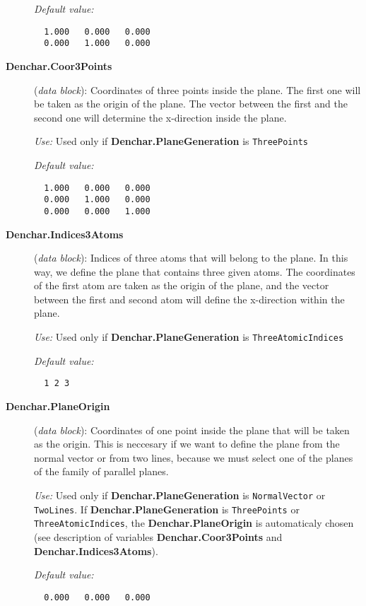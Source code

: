 \begin{description}
{\it Default value:} 
\begin{verbatim}
  1.000   0.000   0.000
  0.000   1.000   0.000
\end{verbatim}

\item[{\bf Denchar.Coor3Points}] ({\it data block}): 
Coordinates of three points inside the plane. The first one will be taken
as the origin of the plane. The vector between the first and the second one 
will determine the x-direction inside the plane.

{\it Use:} Used only if {\bf Denchar.PlaneGeneration} is {\tt ThreePoints}
    
{\it Default value:} 
\begin{verbatim}
  1.000   0.000   0.000
  0.000   1.000   0.000
  0.000   0.000   1.000
\end{verbatim}

\item[{\bf Denchar.Indices3Atoms}] ({\it data block}): 
Indices of three atoms that will belong to the plane. In this way, we
define the plane that contains three given atoms. The coordinates
of the first atom are taken as the origin of the plane, 
and the vector between
the first and second atom will define the x-direction within
the plane.

{\it Use:} Used only if {\bf Denchar.PlaneGeneration}
is {\tt ThreeAtomicIndices}
    
{\it Default value:} 
\begin{verbatim}
  1 2 3
\end{verbatim}

\item[{\bf Denchar.PlaneOrigin}] ({\it data block}): 
Coordinates of one point inside the plane that will be taken as the origin. 
This is neccesary if we want to define the plane from the normal vector or
from two lines, because we must select one of the planes of the family of
parallel planes.

{\it Use:} Used only if {\bf Denchar.PlaneGeneration} is {\tt NormalVector} or
{\tt TwoLines}. If {\bf Denchar.PlaneGeneration} is {\tt ThreePoints}
or {\tt ThreeAtomicIndices}, the {\bf Denchar.PlaneOrigin} is
automaticaly chosen (see description of variables {\bf Denchar.Coor3Points}
and {\bf Denchar.Indices3Atoms}).
    
{\it Default value:} 
\begin{verbatim}
  0.000   0.000   0.000
\end{verbatim}
        

\end{description}
